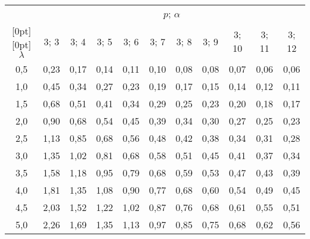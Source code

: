 \begin{table}\small
\begin{center}
\vspace*{2ex}

\begin{tabular}{|c|c|c|c|c|c|c|c|c|c|c|}
\hline
&\multicolumn{10}{c|}{$p$; $\alpha$}\\
\cline{2-11}
\multicolumn{1}{|c|}{\raisebox{6pt}[0pt][0pt]{$\lambda$}}
& 3;  3& 3;  4& 3;  5& 3;  6& 3;  7& 3;  8& 3;  9& 3;  10& 3;  11& 3;  12\\
\hline
 0,5& 0,23& 0,17& 0,14& 0,11& 0,10& 0,08& 0,08& 0,07& 0,06& 0,06\\
 1,0& 0,45& 0,34& 0,27& 0,23& 0,19& 0,17& 0,15& 0,14& 0,12& 0,11\\
 1,5& 0,68& 0,51& 0,41& 0,34& 0,29& 0,25& 0,23& 0,20& 0,18& 0,17\\
 2,0& 0,90& 0,68& 0,54& 0,45& 0,39& 0,34& 0,30& 0,27& 0,25& 0,23\\
 2,5& 1,13& 0,85& 0,68& 0,56& 0,48& 0,42& 0,38& 0,34& 0,31& 0,28\\
 3,0& 1,35& 1,02& 0,81& 0,68& 0,58& 0,51& 0,45& 0,41& 0,37& 0,34\\
 3,5& 1,58& 1,18& 0,95& 0,79& 0,68& 0,59& 0,53& 0,47& 0,43& 0,39\\
 4,0& 1,81& 1,35& 1,08& 0,90& 0,77& 0,68& 0,60& 0,54& 0,49& 0,45\\
 4,5& 2,03& 1,52& 1,22& 1,02& 0,87& 0,76& 0,68& 0,61& 0,55& 0,51\\
 5,0& 2,26& 1,69& 1,35& 1,13& 0,97& 0,85& 0,75& 0,68& 0,62& 0,56\\
\hline
\end{tabular}
\end{center}
\end{table}
